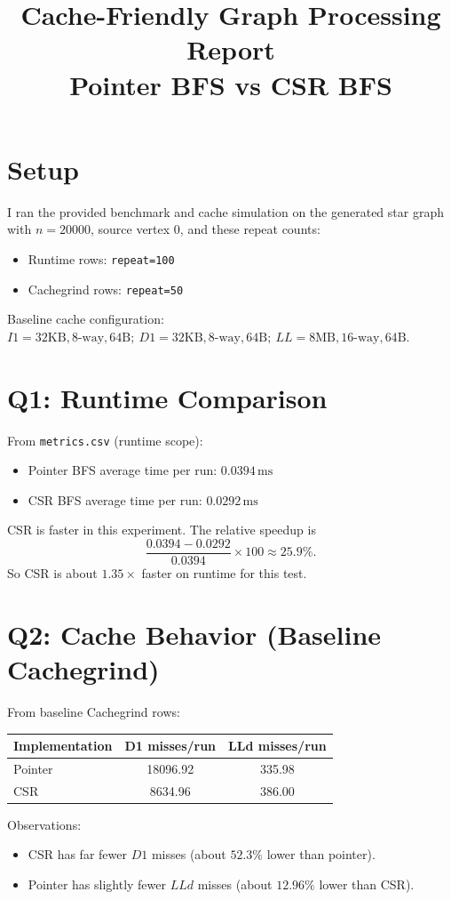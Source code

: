 \documentclass[11pt]{article}
\title{Cache-Friendly Graph Processing Report\\\large Pointer BFS vs CSR BFS}
\author{}
\date{}
\begin{document}
\maketitle

\section*{Setup}
I ran the provided benchmark and cache simulation on the generated star graph with
\(n=20000\), source vertex \(0\), and these repeat counts:
\begin{itemize}
\item Runtime rows: \texttt{repeat=100}
\item Cachegrind rows: \texttt{repeat=50}
\end{itemize}
Baseline cache configuration:
\(I1=32\text{KB}, 8\text{-way}, 64\text{B};\ D1=32\text{KB}, 8\text{-way}, 64\text{B};\ LL=8\text{MB}, 16\text{-way}, 64\text{B}\).

\section*{Q1: Runtime Comparison}
From \texttt{metrics.csv} (runtime scope):
\begin{itemize}
\item Pointer BFS average time per run: \(0.0394\,\text{ms}\)
\item CSR BFS average time per run: \(0.0292\,\text{ms}\)
\end{itemize}

CSR is faster in this experiment.
The relative speedup is
\[
\frac{0.0394 - 0.0292}{0.0394} \times 100 \approx 25.9\%.
\]
So CSR is about \(1.35\times\) faster on runtime for this test.

\section*{Q2: Cache Behavior (Baseline Cachegrind)}
From baseline Cachegrind rows:
\begin{center}
\begin{tabular}{lSS}
\toprule
Implementation & {D1 misses/run} & {LLd misses/run} \\
\midrule
Pointer & 18096.92 & 335.98 \\
CSR     & 8634.96  & 386.00 \\
\bottomrule
\end{tabular}
\end{center}

Observations:
\begin{itemize}
\item CSR has far fewer \(D1\) misses (about \(52.3\%\) lower than pointer).
\item Pointer has slightly fewer \(LLd\) misses (about \(12.96\%\) lower than CSR).
\end{itemize}
\end{document}
